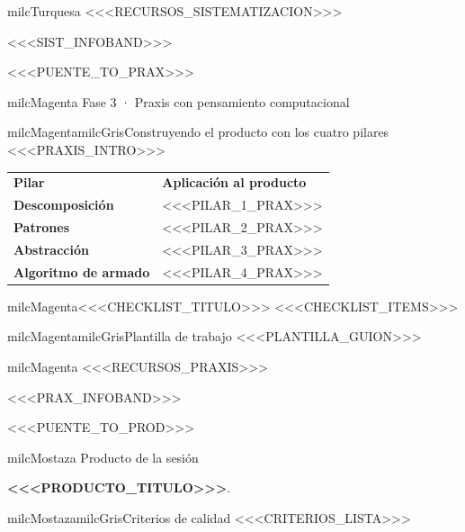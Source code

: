 \documentclass[11pt,letterpaper]{article}
\newcommand{\puente}[1]{%
  \begin{puentebox}%
    \textcolor{milcGradeDark}{\textbf{\textrightarrow}}\hspace{2mm}#1%
  \end{puentebox}%
}
\begin{document}
\begin{infoband}{milcTurquesa}
<<<RECURSOS_SISTEMATIZACION>>>

<<<SIST_INFOBAND>>>
\end{infoband}

\puente{<<<PUENTE_TO_PRAX>>>}

\begin{titlebox}{milcMagenta}
Fase 3 · Praxis con pensamiento computacional
\end{titlebox}

\begin{softbox}{milcMagenta}{milcGris}{Construyendo el producto con los cuatro pilares}
<<<PRAXIS_INTRO>>>
\end{softbox}

\small
\begin{tabularx}{\textwidth}{>{\bfseries\RaggedRight\arraybackslash}p{3.6cm}Y}
\color{white}Pilar & \color{white}\bfseries Aplicación al producto\\
Descomposición & <<<PILAR_1_PRAX>>>\\
Patrones & <<<PILAR_2_PRAX>>>\\
Abstracción & <<<PILAR_3_PRAX>>>\\
Algoritmo de armado & <<<PILAR_4_PRAX>>>\\
\end{tabularx}
\normalsize

\begin{drawbox}{milcMagenta}{<<<CHECKLIST_TITULO>>>}
<<<CHECKLIST_ITEMS>>>
\end{drawbox}

\begin{softbox}{milcMagenta}{milcGris}{Plantilla de trabajo}
<<<PLANTILLA_GUION>>>
\end{softbox}

\begin{infoband}{milcMagenta}
<<<RECURSOS_PRAXIS>>>

<<<PRAX_INFOBAND>>>
\end{infoband}

\puente{<<<PUENTE_TO_PROD>>>}

\begin{titlebox}{milcMostaza}
Producto de la sesión
\end{titlebox}
\textbf{<<<PRODUCTO_TITULO>>>}.
\begin{softbox}{milcMostaza}{milcGris}{Criterios de calidad}
<<<CRITERIOS_LISTA>>>
\end{softbox}
\end{document}
